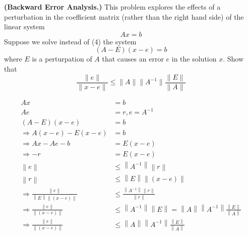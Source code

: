 \textbf{(Backward Error Analysis.)} This problem explores the effects
of a perturbation in the coefficient matrix (rather than the right
hand side) of the linear system \[Ax=b\] Suppose we solve instead of
(4) the system \[(A - E)(x - e) = b\] where $E$ is a perturpation of
$A$ that causes an error $e$ in the solution $x$. Show that \[
\frac{\|e\|}{\| x - e \|} \le \|A\| \|A^{-1}\| \frac{\| E \|}{\| A \|}
\]

{\color{blue}
\begin{align*}
Ax&=b\\
Ae&=r, e=A^{-1}\\
(A-E)(x-e)&=b\\
\Rightarrow A(x-e)-E(x-e)&=b\\
\Rightarrow Ax-Ae-b&=E(x-e)\\
\Rightarrow -r&=E(x-e)\\
\left \| e \right \|&\leqslant \left \| A^{-1} \right \|\left \| r \right \|\\
\left \| r \right \|&\leqslant \left \| E \right \|\left \| (x-e) \right \|\\
\Rightarrow \frac{\left \| e \right \|}{\left \| E \right \|\left \| (x-e) \right \|}&\leqslant \frac{\left \| A^{-1} \right \|\left \| r \right \|}{\left \| r \right \|}\\
\Rightarrow \frac{\left \|e  \right \|}{\left \| (x-e) \right \|} &\leqslant\left \| A^{-1} \right \|\left \| E \right \|=\left \| A \right \|\left \| A^{-1} \right \|\frac{\left \| E \right \|}{\left \| A \right \|}\\
\Rightarrow \frac{\left \|e  \right \|}{\left \| (x-e) \right \|} &\leqslant \left \| A \right \|\left \| A^{-1} \right \| \frac{\left \| E \right \|}{\left \| A \right \|}
\end{align*}

}
